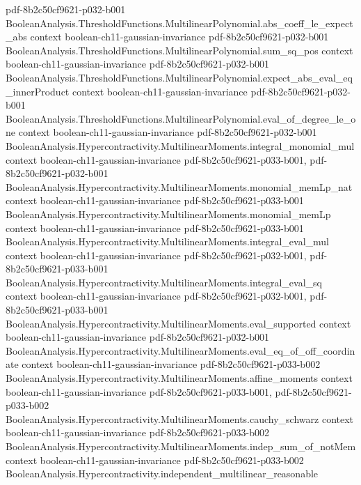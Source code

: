 \begin{theorem}
  {pdf-8b2c50cf9621-p032-b001}
\proofstep
  {BooleanAnalysis.ThresholdFunctions.MultilinearPolynomial.abs_coeff_le_expect_abs}
  {context}
  {boolean-ch11-gaussian-invariance}
  {pdf-8b2c50cf9621-p032-b001}
\proofstep
  {BooleanAnalysis.ThresholdFunctions.MultilinearPolynomial.sum_sq_pos}
  {context}
  {boolean-ch11-gaussian-invariance}
  {pdf-8b2c50cf9621-p032-b001}
\proofstep
  {BooleanAnalysis.ThresholdFunctions.MultilinearPolynomial.expect_abs_eval_eq_innerProduct}
  {context}
  {boolean-ch11-gaussian-invariance}
  {pdf-8b2c50cf9621-p032-b001}
\proofstep
  {BooleanAnalysis.ThresholdFunctions.MultilinearPolynomial.eval_of_degree_le_one}
  {context}
  {boolean-ch11-gaussian-invariance}
  {pdf-8b2c50cf9621-p032-b001}
\proofstep
  {BooleanAnalysis.Hypercontractivity.MultilinearMoments.integral_monomial_mul}
  {context}
  {boolean-ch11-gaussian-invariance}
  {pdf-8b2c50cf9621-p033-b001,
    pdf-8b2c50cf9621-p032-b001}
\proofstep
  {BooleanAnalysis.Hypercontractivity.MultilinearMoments.monomial_memLp_nat}
  {context}
  {boolean-ch11-gaussian-invariance}
  {pdf-8b2c50cf9621-p033-b001}
\proofstep
  {BooleanAnalysis.Hypercontractivity.MultilinearMoments.monomial_memLp}
  {context}
  {boolean-ch11-gaussian-invariance}
  {pdf-8b2c50cf9621-p033-b001}
\proofstep
  {BooleanAnalysis.Hypercontractivity.MultilinearMoments.integral_eval_mul}
  {context}
  {boolean-ch11-gaussian-invariance}
  {pdf-8b2c50cf9621-p032-b001,
    pdf-8b2c50cf9621-p033-b001}
\proofstep
  {BooleanAnalysis.Hypercontractivity.MultilinearMoments.integral_eval_sq}
  {context}
  {boolean-ch11-gaussian-invariance}
  {pdf-8b2c50cf9621-p032-b001,
    pdf-8b2c50cf9621-p033-b001}
\proofstep
  {BooleanAnalysis.Hypercontractivity.MultilinearMoments.eval_supported}
  {context}
  {boolean-ch11-gaussian-invariance}
  {pdf-8b2c50cf9621-p032-b001}
\proofstep
  {BooleanAnalysis.Hypercontractivity.MultilinearMoments.eval_eq_of_off_coordinate}
  {context}
  {boolean-ch11-gaussian-invariance}
  {pdf-8b2c50cf9621-p033-b002}
\proofstep
  {BooleanAnalysis.Hypercontractivity.MultilinearMoments.affine_moments}
  {context}
  {boolean-ch11-gaussian-invariance}
  {pdf-8b2c50cf9621-p033-b001,
    pdf-8b2c50cf9621-p033-b002}
\proofstep
  {BooleanAnalysis.Hypercontractivity.MultilinearMoments.cauchy_schwarz}
  {context}
  {boolean-ch11-gaussian-invariance}
  {pdf-8b2c50cf9621-p033-b002}
\proofstep
  {BooleanAnalysis.Hypercontractivity.MultilinearMoments.indep_sum_of_notMem}
  {context}
  {boolean-ch11-gaussian-invariance}
  {pdf-8b2c50cf9621-p033-b002}
\proofstep
  {BooleanAnalysis.Hypercontractivity.independent_multilinear_reasonable}

\end{theorem}
